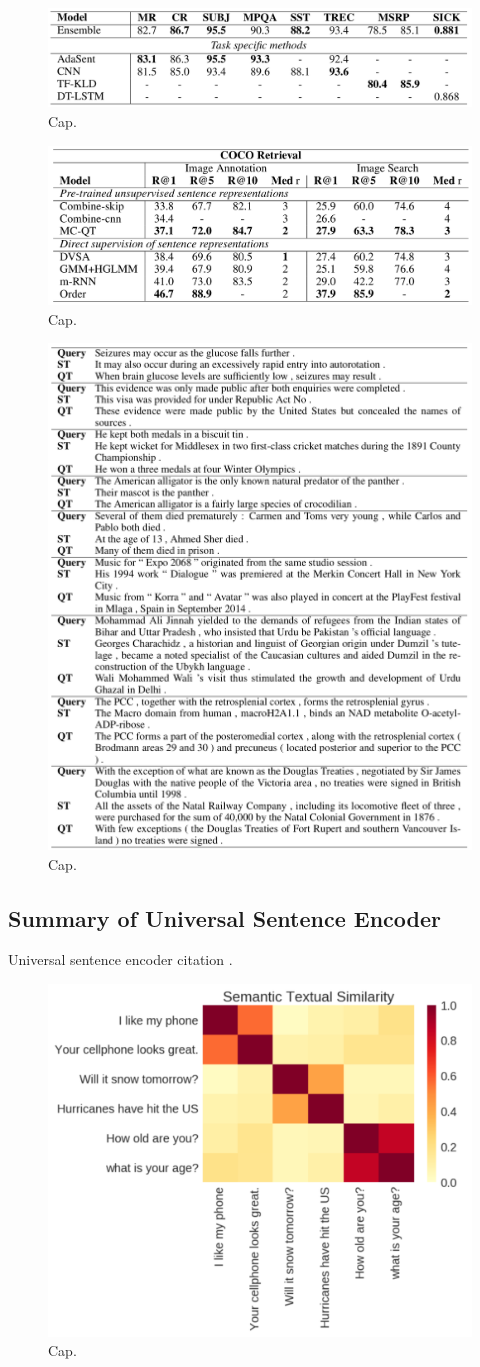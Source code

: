 \begin{figure}
\centering
  \includegraphics[width=.5\linewidth]{files/quickthoughts-4.png}
  \caption{Cap.}
  \label{fig:vae}
\end{figure}

\begin{figure}
\centering
  \includegraphics[width=.5\linewidth]{files/quickthoughts-5.png}
  \caption{Cap.}
  \label{fig:vae}
\end{figure}

\begin{figure}
\centering
  \includegraphics[width=.5\linewidth]{files/quickthoughts-6.png}
  \caption{Cap.}
  \label{fig:vae}
\end{figure}

\subsection{Summary of Universal Sentence Encoder}

Universal sentence encoder citation \cite{use}.

\begin{figure}
\centering
  \includegraphics[width=.5\linewidth]{files/use-1.png}
  \caption{Cap.}
  \label{fig:vae}
\end{figure}

